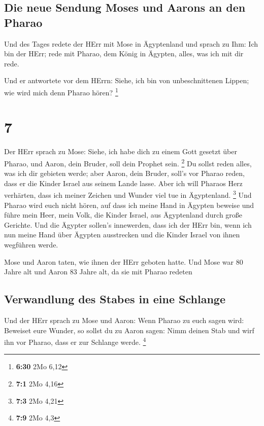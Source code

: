 \hypertarget{die-neue-sendung-moses-und-aarons-an-den-pharao}{%
\subsection{Die neue Sendung Moses und Aarons an den
Pharao}\label{die-neue-sendung-moses-und-aarons-an-den-pharao}}

 Und des Tages redete der HErr mit Mose in Ägyptenland
 und sprach zu Ihm: Ich bin der HErr; rede mit Pharao,
dem König in Ägypten, alles, was ich mit dir rede.

 Und er antwortete vor dem HErrn: Siehe, ich bin von
unbeschnittenen Lippen; wie wird mich denn Pharao hören? \footnote{\textbf{6:30}
  2Mo 6,12}

\hypertarget{section-6}{%
\section{7}\label{section-6}}

 Der HErr sprach zu Mose: Siehe, ich habe dich zu einem
Gott gesetzt über Pharao, und Aaron, dein Bruder, soll dein Prophet
sein. \footnote{\textbf{7:1} 2Mo 4,16}  Du sollst reden
alles, was ich dir gebieten werde; aber Aaron, dein Bruder, soll's vor
Pharao reden, dass er die Kinder Israel aus seinem Lande lasse.
 Aber ich will Pharaos Herz verhärten, dass ich meiner
Zeichen und Wunder viel tue in Ägyptenland. \footnote{\textbf{7:3} 2Mo
  4,21}  Und Pharao wird euch nicht hören, auf dass ich
meine Hand in Ägypten beweise und führe mein Heer, mein Volk, die Kinder
Israel, aus Ägyptenland durch große Gerichte.  Und die
Ägypter sollen's innewerden, dass ich der HErr bin, wenn ich nun meine
Hand über Ägypten ausstrecken und die Kinder Israel von ihnen wegführen
werde.

 Mose und Aaron taten, wie ihnen der HErr geboten hatte.
 Und Mose war 80 Jahre alt und Aaron 83 Jahre alt, da sie
mit Pharao redeten

\hypertarget{verwandlung-des-stabes-in-eine-schlange}{%
\subsection{Verwandlung des Stabes in eine
Schlange}\label{verwandlung-des-stabes-in-eine-schlange}}

 Und der HErr sprach zu Mose und Aaron: 
Wenn Pharao zu euch sagen wird: Beweiset eure Wunder, so sollst du zu
Aaron sagen: Nimm deinen Stab und wirf ihn vor Pharao, dass er zur
Schlange werde. \footnote{\textbf{7:9} 2Mo 4,3}

